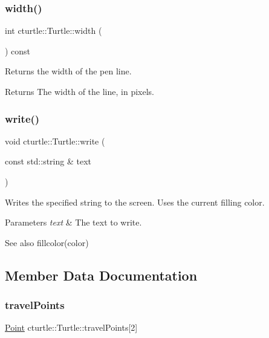 \subsubsection{\texorpdfstring{width()}{width()}\hspace{0.1cm}{\footnotesize\ttfamily [2/2]}}
{\footnotesize\ttfamily int cturtle\+::\+Turtle\+::width (\begin{DoxyParamCaption}{ }\end{DoxyParamCaption}) const\hspace{0.3cm}{\ttfamily [inline]}}

Returns the width of the pen line. \begin{DoxyReturn}{Returns}
The width of the line, in pixels. 
\end{DoxyReturn}
\mbox{\label{classcturtle_1_1Turtle_a6e814845ac619a90aeee25a67a3fc51d}} 
\subsubsection{\texorpdfstring{write()}{write()}}
{\footnotesize\ttfamily void cturtle\+::\+Turtle\+::write (\begin{DoxyParamCaption}\item[{const std\+::string \&}]{text }\end{DoxyParamCaption})}

Writes the specified string to the screen. Uses the current filling color. 
\begin{DoxyParams}{Parameters}
{\em text} & The text to write. \\
\hline
\end{DoxyParams}
\begin{DoxySeeAlso}{See also}
fillcolor(color) 
\end{DoxySeeAlso}


\subsection{Member Data Documentation}
\mbox{\label{classcturtle_1_1Turtle_ab7156951a007fbbc8a07cbb66e7b888b}} 
\subsubsection{\texorpdfstring{travel\+Points}{travelPoints}}
{\footnotesize\ttfamily \hyperlink{structcturtle_1_1ivec2}{Point} cturtle\+::\+Turtle\+::travel\+Points\mbox{[}2\mbox{]}\hspace{0.3cm}{\ttfamily [protected]}}

